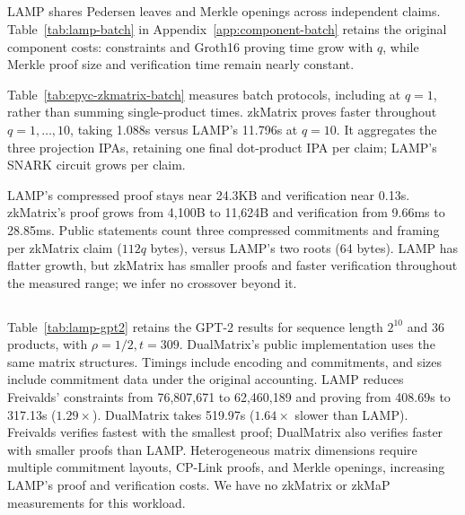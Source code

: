 \subsection[Batching Matrix-Multiplication Claims]
  {}
\label{sec:eval-batch}
\begin{revblock}
LAMP shares Pedersen leaves and Merkle openings across independent claims.
Table~\ref{tab:lamp-batch} in Appendix~\ref{app:component-batch} retains the
original component costs: constraints and Groth16 proving time grow with
\(q\), while Merkle proof size and verification time remain nearly constant.

Table~\ref{tab:epyc-zkmatrix-batch} measures batch protocols, including at
\(q=1\), rather than summing single-product times. zkMatrix proves faster
throughout \(q=1,\ldots,10\), taking 1.088s versus LAMP's 11.796s at \(q=10\).
It aggregates the three projection IPAs, retaining one final dot-product IPA
per claim; LAMP's SNARK circuit grows per claim.

LAMP's compressed proof stays near 24.3KB and verification near 0.13s.
zkMatrix's proof grows from 4,100B to 11,624B and verification from 9.66ms to
28.85ms. Public statements count three compressed commitments and framing per
zkMatrix claim (\(112q\) bytes), versus LAMP's two roots (64 bytes).
LAMP has flatter growth, but zkMatrix has smaller proofs
and faster verification throughout the measured range; we infer no crossover
beyond it.
\end{revblock}



\subsection[GPT-2 Workload]
  {}
\label{sec:eval-gpt2}

\begin{revblock}
Table~\ref{tab:lamp-gpt2} retains the GPT-2 results for sequence length
\(2^{10}\) and 36 products, with \(\rho=1/2,t=309\). DualMatrix's public
implementation uses the same matrix structures. Timings include encoding and
commitments, and sizes include commitment data under the original accounting.
LAMP reduces Freivalds' constraints from 76,807,671 to 62,460,189 and proving
from 408.69s to 317.13s (\(1.29\times\)). DualMatrix takes 519.97s
(\(1.64\times\) slower than LAMP). Freivalds verifies fastest with the smallest
proof; DualMatrix also verifies faster with smaller proofs than LAMP.
Heterogeneous matrix dimensions require multiple commitment layouts, CP-Link
proofs, and Merkle openings, increasing LAMP's proof and verification costs.
We have no zkMatrix or zkMaP measurements for this workload.
\end{revblock}

